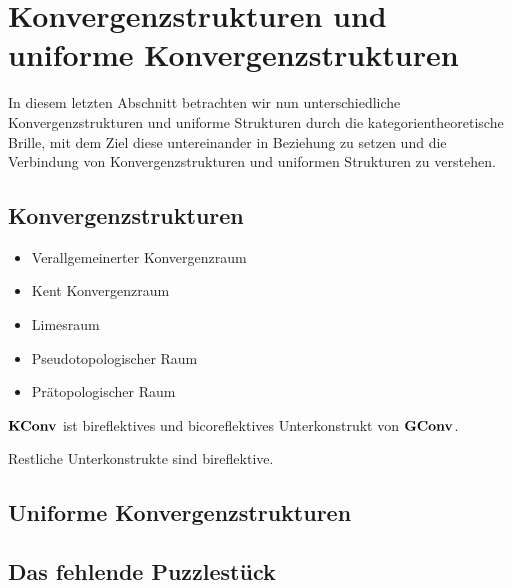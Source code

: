 \section{Konvergenzstrukturen und uniforme Konvergenzstrukturen}

In diesem letzten Abschnitt betrachten wir nun unterschiedliche Konvergenzstrukturen und uniforme Strukturen durch die kategorientheoretische Brille, mit dem Ziel diese untereinander in Beziehung zu setzen und die Verbindung von Konvergenzstrukturen und uniformen Strukturen zu verstehen.

\subsection{Konvergenzstrukturen}

\begin{defn}
  \begin{itemize}
    \item Verallgemeinerter Konvergenzraum
    \item Kent Konvergenzraum
    \item Limesraum
    \item Pseudotopologischer Raum
    \item Prätopologischer Raum
  \end{itemize}
\end{defn}

\begin{bem}
  
\end{bem}

\begin{prop}
  $\mathbf{KConv}$ ist bireflektives und bicoreflektives Unterkonstrukt von $\mathbf{GConv}$.
\end{prop}

\begin{prop}[2.3.1.5]
  Restliche Unterkonstrukte sind bireflektive.
\end{prop}

\subsection{Uniforme Konvergenzstrukturen}

\subsection{Das fehlende Puzzlestück}

